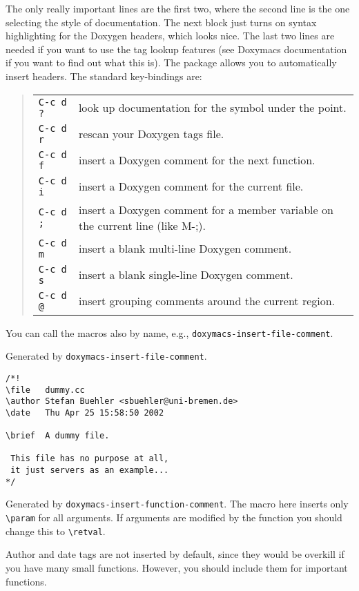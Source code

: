 The only really important lines are the first two, where the second
line is the one selecting the style of documentation. The next block
just turns on syntax highlighting for the Doxygen headers, which looks
nice. The last two lines are needed if you want to use the tag lookup
features (see Doxymacs documentation if you want to find out what this
is).  The package allows you to automatically insert headers. The
standard key-bindings are:
\begin{quote}
\begin{tabularx}{.8\hsize}{@{}lX}
\texttt{C-c d ?} & look up documentation for the symbol under the point.\\
\texttt{C-c d r} & rescan your Doxygen tags file.\\
\texttt{C-c d f} & insert a Doxygen comment for the next function.\\
\texttt{C-c d i} & insert a Doxygen comment for the current file.\\
\texttt{C-c d ;} & insert a Doxygen comment for a member variable on the current line (like M-;).\\
\texttt{C-c d m} & insert a blank multi-line Doxygen comment.\\
\texttt{C-c d s} & insert a blank single-line Doxygen comment.\\
\texttt{C-c d @} & insert grouping comments around the current region.\\
\end{tabularx}
\end{quote}
You can call the macros also by name, e.g., \verb|doxymacs-insert-file-comment|.


Generated by \verb|doxymacs-insert-file-comment|.

\begin{verbatim}
/*!
\file   dummy.cc
\author Stefan Buehler <sbuehler@uni-bremen.de>
\date   Thu Apr 25 15:58:50 2002

\brief  A dummy file.

 This file has no purpose at all,
 it just servers as an example... 
*/
\end{verbatim}


Generated by \verb|doxymacs-insert-function-comment|.
The macro here inserts only \verb|\param| for all
arguments. If arguments are modified by the function you should
change this to \verb|\retval|.

Author and date tags are not inserted by default, since they would be
overkill if you have many small functions. However, you should include
them for important functions. 

